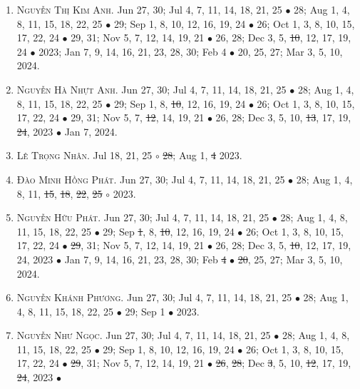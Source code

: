 \documentclass{article}
\begin{document}
\begin{enumerate}
	\item \textsc{Nguyễn Thị Kim Anh.} {\sf[In]} Jun 27, 30; Jul 4, 7, 11, 14, 18, 21, 25 $\bullet$ 28; Aug 1, 4, 8, 11, 15, 18, 22, 25 $\bullet$ 29; Sep 1, 8, 10, 12, 16, 19, 24 $\bullet$ 26; Oct 1, 3, 8, 10, 15, 17, 22, 24 $\bullet$ 29, 31; Nov 5, 7, 12, 14, 19, 21 $\bullet$ 26, 28; Dec 3, 5, \st{10}, 12, 17, 19, 24 $\bullet$ 2023; Jan 7, 9, 14, 16, 21, 23, 28, 30; Feb 4 $\bullet$ 20, 25, 27; Mar 3, 5, 10, 2024.
	\item \textsc{Nguyễn Hà Nhựt Anh.} {\sf[In]} Jun 27, 30; Jul 4, 7, 11, 14, 18, 21, 25 $\bullet$ 28; Aug 1, 4, 8, 11, 15, 18, 22, 25 $\bullet$ 29; Sep 1, 8, \st{10}, 12, 16, 19, 24 $\bullet$ 26; Oct 1, 3, 8, 10, 15, 17, 22, 24 $\bullet$ 29, 31; Nov 5, 7, \st{12}, 14, 19, 21 $\bullet$ 26, 28; Dec 3, 5, 10, \st{13}, 17, 19, \st{24}, 2023 $\bullet$ Jan 7, 2024. {\sf[Out]}
	\item \textsc{Lê Trọng Nhân.} {\sf[In]} Jul 18, 21, 25 $\circ$ \st{28}; Aug 1, \st{4} 2023. \sf{[Out]}
	\item \textsc{Đào Minh Hồng Phát.} {\sf[In]} Jun 27, 30; Jul 4, 7, 11, 14, 18, 21, 25 $\bullet$ 28; Aug 1, 4, 8, 11, \st{15}, \st{18}, \st{22}, \st{25} $\circ$ 2023. \sf{[Out]}
	\item \textsc{Nguyễn Hữu Phát.} {\sf[In]} Jun 27, 30; Jul 4, 7, 11, 14, 18, 21, 25 $\bullet$ 28; Aug 1, 4, 8, 11, 15, 18, 22, 25 $\bullet$ 29; Sep \st{1}, 8, \st{10}, 12, 16, 19, 24 $\bullet$ 26; Oct 1, 3, 8, 10, 15, 17, 22, 24 $\bullet$ \st{29}, 31; Nov 5, 7, 12, 14, 19, 21 $\bullet$ 26, 28; Dec 3, 5, \st{10}, 12, 17, 19, 24, 2023 $\bullet$ Jan 7, 9, 14, 16, 21, 23, 28, 30; Feb \st{4} $\bullet$ \st{20}, 25, 27; Mar 3, 5, 10, 2024.
	\item \textsc{Nguyễn Khánh Phương.} {\sf[In]} Jun 27, 30; Jul 4, 7, 11, 14, 18, 21, 25 $\bullet$ 28; Aug 1, 4, 8, 11, 15, 18, 22, 25 $\bullet$ 29; Sep 1 $\bullet$ 2023. \sf{[Out]}
	\item \textsc{Nguyễn Như Ngọc.} {\sf[In]} Jun 27, 30; Jul 4, 7, 11, 14, 18, 21, 25 $\bullet$ 28; Aug 1, 4, 8, 11, 15, 18, 22, 25 $\bullet$ 29; Sep 1, 8, 10, 12, 16, 19, 24 $\bullet$ 26; Oct 1, 3, 8, 10, 15, 17, 22, 24 $\bullet$ \st{29}, 31; Nov 5, 7, 12, 14, 19, 21 $\bullet$ \st{26}, \st{28}; Dec \st{3}, 5, 10, \st{12}, 17, 19, \st{24}, 2023 $\bullet$ {\sf[Out]}
\end{enumerate}

\end{document}
